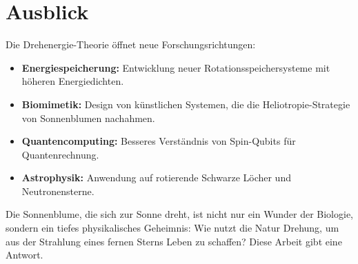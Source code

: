 \documentclass[12pt,a4paper]{report}
\theoremstyle{plain}
\theoremstyle{definition}
\theoremstyle{remark}
\begin{document}
\section{Ausblick}

Die Drehenergie-Theorie öffnet neue Forschungsrichtungen:

\begin{itemize}
	\item \textbf{Energiespeicherung:} Entwicklung neuer Rotationsspeichersysteme mit höheren Energiedichten.
	
	\item \textbf{Biomimetik:} Design von künstlichen Systemen, die die Heliotropie-Strategie von Sonnenblumen nachahmen.
	
	\item \textbf{Quantencomputing:} Besseres Verständnis von Spin-Qubits für Quantenrechnung.
	
	\item \textbf{Astrophysik:} Anwendung auf rotierende Schwarze Löcher und Neutronensterne.
\end{itemize}

Die Sonnenblume, die sich zur Sonne dreht, ist nicht nur ein Wunder der Biologie, sondern ein tiefes physikalisches Geheimnis: Wie nutzt die Natur Drehung, um aus der Strahlung eines fernen Sterns Leben zu schaffen? Diese Arbeit gibt eine Antwort.
\end{document}
